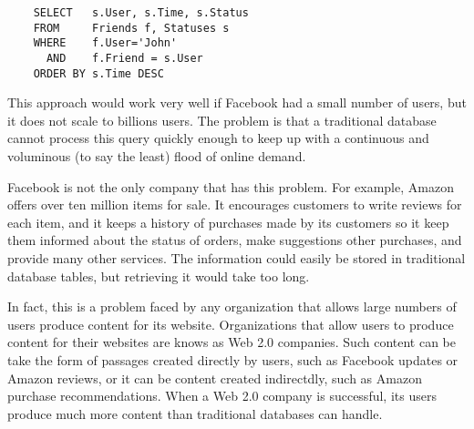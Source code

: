 \begin{verbatim}
	SELECT   s.User, s.Time, s.Status
	FROM     Friends f, Statuses s
	WHERE    f.User='John'
	  AND    f.Friend = s.User
	ORDER BY s.Time DESC
\end{verbatim}

This approach would work very well if Facebook had a small number of users, 
but it does not scale to billions users.  
The problem is that a traditional database cannot process 
this query quickly enough to keep up with a continuous
and voluminous (to say the least) flood of online demand.

Facebook is not the only company that has this problem.  
For example, Amazon offers over ten million items for sale.  
It encourages customers to write reviews for each item, and it keeps a history
of purchases made by its customers so it keep them informed about the status of orders,
make suggestions other purchases, and provide many other services.
The information could easily be stored in traditional database tables, 
but retrieving it would take too long.

In fact, this is a problem faced by any organization that
allows large numbers of users produce content for its website.
Organizations that allow users to produce content for their websites
are knows as Web 2.0 companies.
Such content can be take the form of passages created directly by users, 
such as Facebook updates or Amazon reviews, or it can be content created
indirectdly, such as Amazon purchase recommendations.
When a Web 2.0 company is successful,
its users produce much more content than traditional databases can handle.

